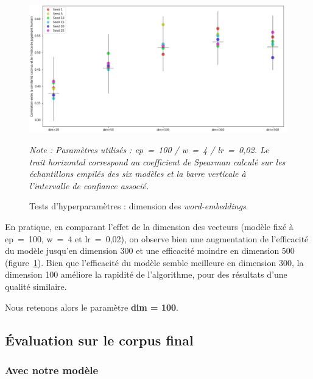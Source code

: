 \documentclass[11pt,french,french]{article}
\begin{document}
\begin{figure}[htp]
\begin{center}
\includegraphics[width=1\textwidth]{img/test_parametres2.png}
\captionsetup{margin=0cm,format=hang,justification=justified}
\caption{Tests d'hyperparamètres : dimension des \emph{word-embeddings}.}\label{fig:figure_dim}
\end{center}
\vspace{-0.3cm}
\footnotesize
\emph{Note : Paramètres utilisés : ep = 100 / w = 4 / lr = 0,02.\newline
Le trait horizontal correspond au coefficient de Spearman calculé sur les échantillons empilés des six modèles et la barre verticale à l'intervalle de confiance associé.}
\end{figure}

En pratique, en comparant l'effet de la dimension des vecteurs (modèle
fixé à ep~=~100, w~=~4 et lr~=~0,02), on observe bien une augmentation
de l'efficacité du modèle jusqu'en dimension 300 et une efficacité
moindre en dimension 500 (figure~\ref{fig:figure_dim}). Bien que
l'efficacité du modèle semble meilleure en dimension 300, la dimension
100 améliore la rapidité de l'algorithme, pour des résultats d'une
qualité similaire.

\faArrowCircleRight{} Nous retenons alors le paramètre \textbf{dim =
100}.

\subsection{Évaluation sur le corpus
final}\label{uxe9valuation-sur-le-corpus-final}

\subsubsection{\texorpdfstring{Avec \og notre
\fg modèle}{Avec notre modèle}}\label{avec-notre-moduxe8le}
\end{document}
